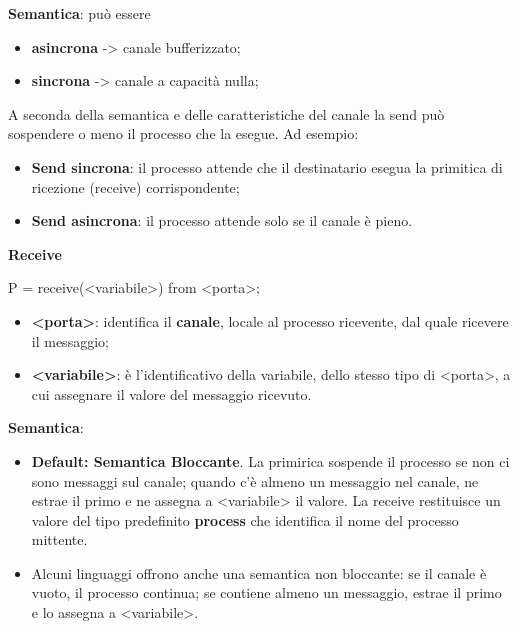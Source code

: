 \documentclass{article}
\begin{document}
\vspace{3mm}
\textbf{Semantica}: può essere
\begin{itemize}
    \item \textbf{asincrona} -> canale bufferizzato;
    \item \textbf{sincrona} -> canale a capacità nulla;
\end{itemize}

A seconda della semantica e delle caratteristiche del canale la send può sospendere o meno il processo che la esegue. Ad esempio:
\begin{itemize}
    \item \textbf{Send sincrona}: il processo attende che il destinatario esegua la primitica di ricezione (receive) corrispondente;
    \item \textbf{Send asincrona}: il processo attende solo se il canale è pieno.
\end{itemize}

\vspace{5mm}
\textbf{Receive}
\vspace{3mm}

\begin{center}
    P = receive(<variabile>) from <porta>;
\end{center}

\begin{itemize}
    \item \textbf{<porta>}: identifica il \textbf{canale}, locale al processo ricevente, dal quale ricevere il messaggio;
    \item \textbf{<variabile>}: è l'identificativo della variabile, dello stesso tipo di <porta>, a cui assegnare il valore del messaggio ricevuto.
\end{itemize}

\vspace{3mm}
\textbf{Semantica}:
\begin{itemize}
    \item \textbf{Default: Semantica Bloccante}. La primirica sospende il processo se non ci sono messaggi sul canale; quando c'è almeno un messaggio nel canale, ne estrae il primo
        e ne assegna a <variabile> il valore. La receive restituisce un valore del tipo predefinito \textbf{process} che identifica il nome del processo mittente.
    \item Alcuni linguaggi offrono anche una semantica non bloccante: se il canale è vuoto, il processo continua; se contiene almeno un messaggio, estrae il primo e lo assegna a
        <variabile>.
\end{itemize}
\end{document}
